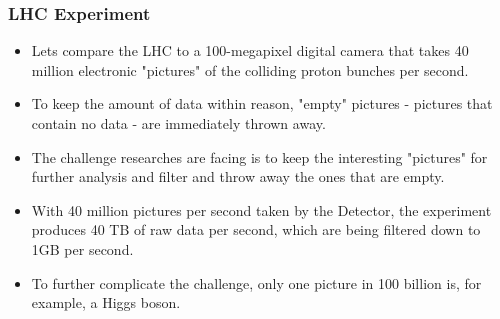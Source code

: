 \documentclass[8pt]{beamer}
\begin{document}
\begin{frame}
\frametitle{LHC Experiment}
\begin{itemize}
\item Lets compare the LHC to a 100-megapixel digital camera that takes 40 million 
electronic "pictures" of the colliding proton bunches per second.\\[0.5cm] 
\item To keep the amount of data within reason, "empty" pictures - pictures that contain
no data - are immediately thrown away.\\[0.5cm]
\item The challenge researches are facing is to keep the interesting "pictures" for
further analysis and filter and throw away the ones that are empty.\\[0.5cm]
\item With 40 million pictures per second taken by the Detector, the experiment produces
40 TB of raw data per second, which are being filtered down to 1GB per second.\\[0.5cm]
\item To further complicate the challenge, only one picture in 100 billion is, for
example, a Higgs boson. 
\end{itemize}
\end{frame}
\end{document}
